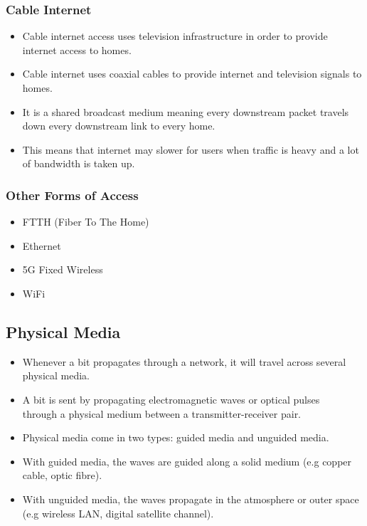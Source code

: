 \documentclass{article}
\begin{document}
\subsubsection{Cable Internet}

\begin{itemize}
    \item Cable internet access uses television infrastructure in order to provide internet access to homes.
    \item Cable internet uses coaxial cables to provide internet and television signals to homes.
    \item It is a shared broadcast medium meaning every downstream packet travels down every downstream link to every home.
    \item This means that internet may slower for users when traffic is heavy and a lot of bandwidth is taken up.
\end{itemize}

\subsubsection{Other Forms of Access}

\begin{itemize}
    \item FTTH (Fiber To The Home)
    \item Ethernet
    \item 5G Fixed Wireless
    \item WiFi
\end{itemize}

\subsection{Physical Media}

\begin{itemize}
    \item Whenever a bit propagates through a network, it will travel across several physical media.
    \item A bit is sent by propagating electromagnetic waves or optical pulses \\ through a physical medium between a transmitter-receiver pair.
    \item Physical media come in two types: guided media and unguided media.
    \item With guided media, the waves are guided along a solid medium (e.g copper cable, optic fibre).
    \item With unguided media, the waves propagate in the atmosphere or outer space (e.g wireless LAN, digital satellite channel).
\end{itemize}

\glsaddall
\printglossaries
\end{document}
